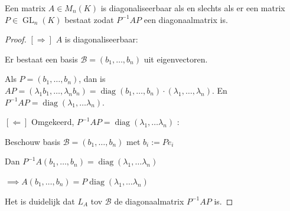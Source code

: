 \begin{lemma}[6.3.3]
    Een matrix $A \in M_n(K)$ is diagonaliseerbaar als en slechts als er een matrix $P \in \operatorname{GL}_n(K)$ bestaat zodat $P^{-1}AP$ een diagonaalmatrix is.
\end{lemma}
\begin{proof}
    \([\Rightarrow]\) \(A\) is diagonaliseerbaar:

    Er bestaat een basis \(\mathcal{B} = (b_1, \dots, b_n)\) uit eigenvectoren.

    Als \(P = (b_1, \dots, b_n)\), dan is \(AP = (\lambda_1 b_1, \dots, \lambda_n b_n) = \operatorname{diag}(b_1, \dots, b_n) \cdot (\lambda_1,\dots,\lambda_n)\).
    En \(P^{-1}AP = \operatorname{diag}(\lambda_1,\dots\lambda_n)\).

    \([\Leftarrow]\) Omgekeerd, \(P^{-1}AP= \operatorname{diag}(\lambda_1,\dots\lambda_n)\) :

    Beschouw basis \(\mathcal{B} = (b_1, \dots, b_n)\) met \(b_i := Pe_i\)

    Dan \(P^{-1}A(b_1, \dots , b_n)= \operatorname{diag}(\lambda_1,\dots\lambda_n)\)

    \(\implies A(b_1, \dots , b_n)= P \operatorname{diag}(\lambda_1,\dots\lambda_n)\)

    Het is duidelijk dat \(L_A \) tov \(\mathcal{B}\) de diagonaalmatrix \(P^{-1}AP\) is.

\end{proof}


